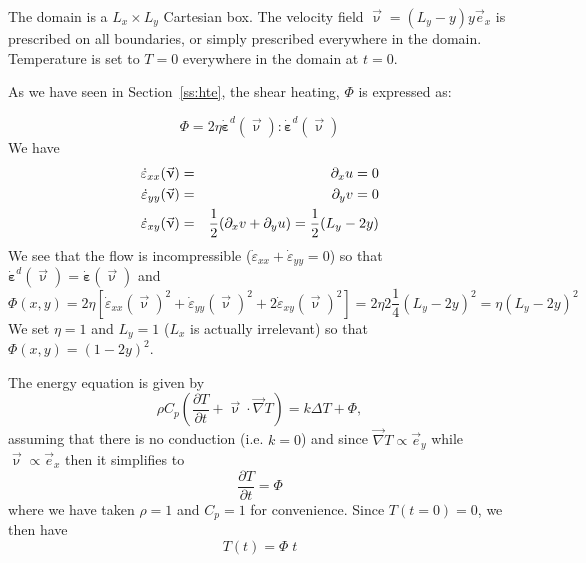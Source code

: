 The domain is a $L_x \times L_y$ Cartesian box. 
The velocity field $\vec{\upnu} = (L_y - y)y \vec{e}_x$ is prescribed on all 
boundaries, or simply prescribed everywhere in the domain. 
Temperature is set to $T=0$ everywhere in the domain at $t=0$. 

As we have seen in Section~\ref{ss:hte}, the shear heating, $\Phi$ is expressed as: 

\begin{equation}
\Phi = 2 \eta  \dot{\bm \varepsilon}^d(\vec\upnu) : \dot{\bm \varepsilon}^d(\vec\upnu)
\end{equation}
We have 
\begin{eqnarray}
\dot{\varepsilon}_{xx}(\vec\upnu) &=& \partial_x u = 0 \nonumber\\
\dot{\varepsilon}_{yy}(\vec\upnu) &=& \partial_y v = 0 \nonumber\\
\dot{\varepsilon}_{xy}(\vec\upnu) &=& \frac12( \partial_x v + \partial_y u) = \frac{1}{2}(L_y-2y)
\end{eqnarray}
We see that the flow is incompressible ($\dot{\varepsilon}_{xx}+\dot{\varepsilon}_{yy}=0$)
so that $\dot{\bm \varepsilon}^d(\vec\upnu)= \dot{\bm \varepsilon}(\vec\upnu)$ and 
\[
\Phi(x,y) = 
2 \eta [ \dot{\varepsilon}_{xx}(\vec\upnu) ^2 + \dot{\varepsilon}_{yy}(\vec\upnu)^2
+ 2 \dot{\varepsilon}_{xy}(\vec\upnu)^2 ]
= 2\eta 2\frac{1}{4}(L_y-2y)^2 = \eta (L_y-2y)^2
\]
We set $\eta=1$ and  $L_y=1$ ($L_x$ is actually irrelevant) so that 
$\Phi(x,y)=(1-2y)^2$.

 
The energy equation is given by
\begin{equation}
\rho C_p \left( \frac{\partial T}{\partial t} + \vec{\upnu} \cdot \vec{\nabla} T  \right) 
= k \Delta T + \Phi,
\end{equation}
assuming that there is no conduction (i.e. $k=0$) and since $\vec{\nabla}T \propto \vec{e}_y$ while 
$\vec\upnu \propto \vec{e}_x$ then it simplifies to  
\[ 
\frac{\partial T}{\partial t } = \Phi 
\]
where we have taken $\rho=1$ and $C_p=1$ for convenience.
Since $T(t=0)=0$, we then have
\[
T(t) = \Phi\; t
\]







